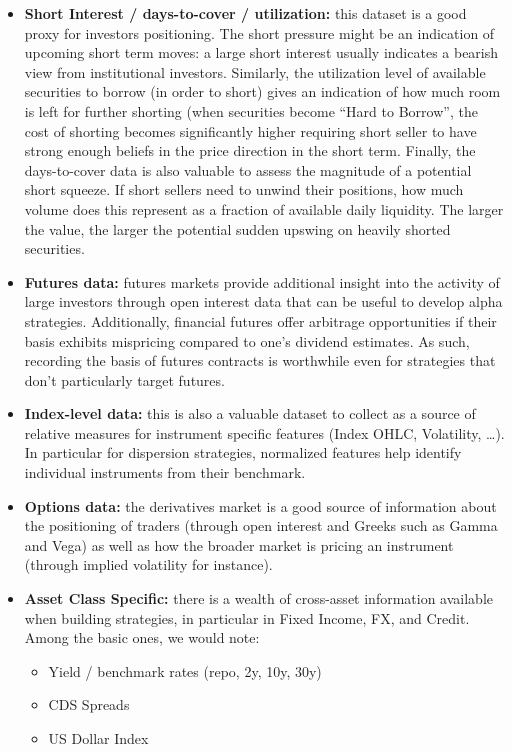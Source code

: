 \begin{itemize}
\item \textbf{Short Interest / days-to-cover / utilization:} this dataset is a good proxy for investors positioning. The short pressure might be an indication of upcoming short term moves: a large short interest usually indicates a bearish view from institutional investors. Similarly, the utilization level of available securities to borrow (in order to short) gives an indication of how much room is left for further shorting (when securities become ``Hard to Borrow'', the cost of shorting becomes significantly higher requiring short seller to have strong enough beliefs in the price direction in the short term. Finally, the days-to-cover data is also valuable to assess the magnitude of a potential short squeeze. If short sellers need to unwind their positions, how much volume does this represent as a fraction of available daily liquidity. The larger the value, the larger the potential sudden upswing on heavily shorted securities.

\item \textbf{Futures data:} futures markets provide additional insight into the activity of large investors through open interest data that can be useful to develop alpha strategies. Additionally, financial futures offer arbitrage opportunities if their basis exhibits mispricing compared to one's dividend estimates. As such, recording the basis of futures contracts is worthwhile even for strategies that don't particularly target futures.

\item \textbf{Index-level data:} this is also a valuable dataset to collect as a source of relative measures for instrument specific features (Index OHLC, Volatility, \dots). In particular for dispersion strategies, normalized features help identify individual instruments from their benchmark. 

\item \textbf{Options data:} the derivatives market is a good source of information about the positioning of traders (through open interest and Greeks such as Gamma and Vega) as well as how the broader market is pricing an instrument (through implied volatility for instance).

\item \textbf{Asset Class Specific:} there is a wealth of cross-asset information available when building strategies, in particular in Fixed Income, FX, and Credit. Among the basic ones, we would note:
        \begin{itemize}
        \item Yield / benchmark rates (repo, 2y, 10y, 30y)
        \item CDS Spreads
        \item US Dollar Index
        \end{itemize}
\end{itemize}

